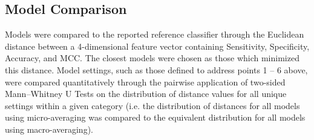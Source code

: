 \subsection{Model Comparison}
Models were compared to the reported reference classifier through the Euclidean distance between a 4-dimensional
feature vector containing Sensitivity, Specificity, Accuracy, and MCC. The closest models were chosen as those which
minimized this distance. Model settings, such as those defined to address points 1 -- 6 above, were compared
quantitatively through the pairwise application of two-sided Mann–Whitney U Tests on the distribution of distance
values for all unique settings within a given category (i.e. the distribution of distances for all models using
micro-averaging was compared to the equivalent distribution for all models using macro-averaging).

